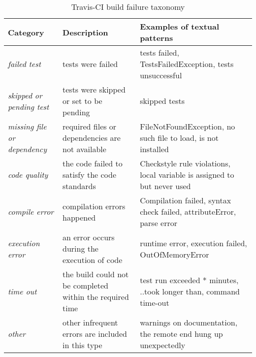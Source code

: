 
\begin{table}[t] \centering
\small
  \caption{Travis-CI build failure taxonomy
  \vspace{-0.2cm}
  }
  \label{error_types}

\begin{tabular}{ p{1.5cm}  p{2.5cm}  p{3.5cm} }
\hline 	
\hline 
Category & Description & Examples of textual patterns \\ \hline 
\emph{failed test} & tests were failed & tests failed, TestsFailedException, tests unsuccessful\\ \hline
\emph{skipped or pending test} & tests were skipped or set to be pending & skipped tests \\ \hline
\emph{missing file or dependency} & required files or dependencies are not available &  FileNotFoundException, no such file to load, is not installed \\ \hline
\emph{code quality} & the code failed to satisfy the code standards &  Checkstyle rule violations, local variable is assigned to but never used\\ \hline
\emph{compile error} &compilation errors happened & Compilation failed, syntax check failed, attributeError, parse error\\ \hline
\emph{execution error} &an error occurs during the execution of code & runtime error, execution failed, OutOfMemoryError\\ \hline
\emph{time out} & the build could not be completed within the required time& test run exceeded * minutes, ..took longer than, command time-out \\ \hline 
\emph{other} &other infrequent errors are included in this type & warnings on documentation, the remote end hung up unexpectedly \\
\hline

\end{tabular}

\end{table}

